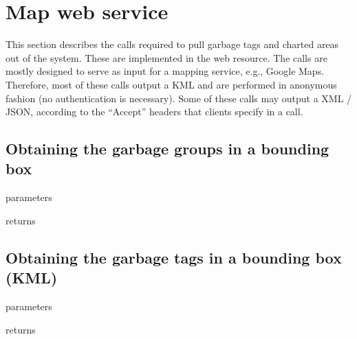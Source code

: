 \section{Map web service}
\label{sec:call:map}

This section describes the calls required to pull garbage tags and charted areas
out of the system. These are implemented in the
 web resource. The
calls are mostly designed to serve as input for a mapping service, e.g., Google
Maps. Therefore, most of these calls output a KML and are performed in
anonymous fashion (no authentication is necessary). Some of these calls may
output a XML / JSON, according to the ``Accept'' headers that clients specify
in a call.

\subsection{Obtaining the garbage groups in a bounding box}

\begin{apidata}{parameters}
  \begin{datalist}
  \end{datalist}
\end{apidata}
\begin{apidata}{returns}
  \begin{datalist}
  \end{datalist}
\end{apidata}


\subsection{Obtaining the garbage tags in a bounding box (KML)}

\begin{apidata}{parameters}
  \begin{datalist}
  \end{datalist}
\end{apidata}
\begin{apidata}{returns}
  \begin{datalist}
  \end{datalist}
\end{apidata}

